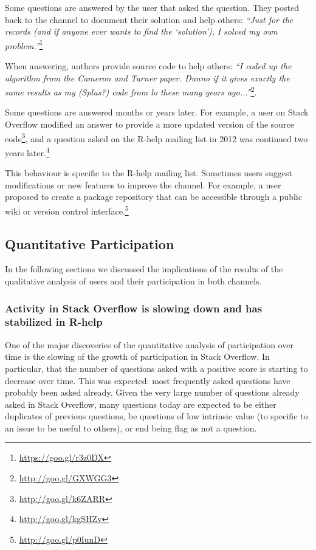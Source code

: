 \documentclass[smallextended]{svjour3}       %
\newcommand{\SO}{Stack Overflow\xspace}
\newcommand{\RH}{R-help\xspace}
\begin{document}
\begin{description}[itemsep=2pt, topsep=0pt, leftmargin=1em, parsep=0pt]
\item[I answered my own question:] Some questions are answered by the user that asked the question. They posted back to the channel to document their solution and help others: \textit{``Just for the records (and if anyone ever wants to find the `solution'), I solved my own problem.''}\footnote{\url{https://goo.gl/r3z0DX}} 
 
\item[I did it for you:] When answering, authors provide source code to help others: \textit{``I coded up the algorithm from the Cameron and Turner paper. Dunno if it gives exactly the same results as my (Splus?) code from lo these many years ago...''}\footnote{\url{http://goo.gl/GXWGG3}}.

\item[Updated or continued years later:] Some questions are answered months or years later.
For example, a user on \SO modified an answer to provide a more updated version of the source code\footnote{\url{http://goo.gl/k6ZARR}}, and a {question asked on the \RH mailing list in 2012 was continued two years later.}\footnote{\url{http://goo.gl/kgSHZv}}

\item[Ideas to improve the channel:] This behaviour is specific to the \RH mailing list. Sometimes users suggest modifications or new features to improve the channel. For example, a {user proposed to create a package repository that can be accessible through a public wiki or version control interface.}\footnote{\url{http://goo.gl/p0IunD}}
\end{description}

\subsection{Quantitative Participation}

In the following sections we discussed the implications of the results of the qualitative analysis of users and their
participation in both channels.


\subsubsection{Activity in \SO is slowing down and has stabilized in \RH}

One of the major discoveries of the quantitative analysis of participation over time is the slowing of the growth of
participation in \SO. In particular, that the number of questions asked with a positive score is starting to 
decrease over time. This was expected: most frequently asked questions have probably been asked already.  Given the
very large number of questions already asked in \SO, many questions today are expected to be either duplicates of previous
questions, be questions of low intrinsic value (to specific to an issue to be useful to others), or end being flag as
not a question. 
\end{document}
